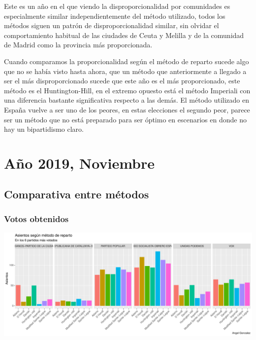 \documentclass[12pt,a4paper,]{book}
\numberwithin{dummy}{section}
\theoremstyle{ocrenumbox}
\theoremstyle{blacknumex}
\theoremstyle{blacknumbox}
\theoremstyle{ocrenum}
\theoremstyle{ocrenum}
\begin{document}
Este es un año en el que viendo la disproporcionalidad por comunidades
es especialmente similar independientemente del método utilizado, todos
los métodos siguen un patrón de disproporcionalidad similar, sin olvidar
el comportamiento habitual de las ciudades de Ceuta y Melilla y de la
comunidad de Madrid como la provincia más proporcionada.

Cuando comparamos la proporcionalidad según el método de reparto sucede
algo que no se había visto hasta ahora, que un método que anteriormente
a llegado a ser el más disproporcionado sucede que este año es el más
proporcionado, este método es el Huntington-Hill, en el extremo opuesto
está el método Imperiali con una diferencia bastante significativa
respecto a las demás. El método utilizado en España vuelve a ser uno de
los peores, en estas elecciones el segundo peor, parece ser un método
que no está preparado para ser óptimo en escenarios en donde no hay un
bipartidismo claro.

\hypertarget{auxf1o-2019-noviembre}{%
\section{Año 2019, Noviembre}\label{auxf1o-2019-noviembre}}

\hypertarget{comparativa-entre-muxe9todos-14}{%
\subsection{Comparativa entre
métodos}\label{comparativa-entre-muxe9todos-14}}

\hypertarget{votos-obtenidos-14}{%
\subsubsection{Votos obtenidos}\label{votos-obtenidos-14}}

\begin{center}\includegraphics[width=0.95\linewidth]{figurasR/unnamed-chunk-185-1} \end{center}
\end{document}

